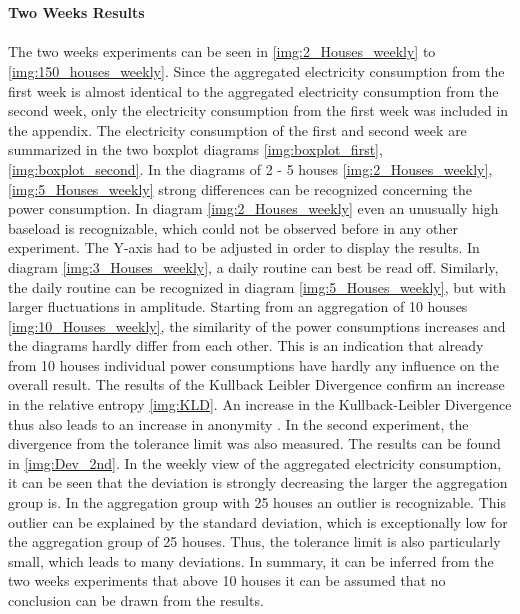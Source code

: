 \\
\\
\textbf{Two Weeks Results}
\\
\\
The two weeks experiments can be seen in \ref{img:2_Houses_weekly} to \ref{img:150_houses_weekly}. Since the aggregated electricity consumption from the first week is almost identical to the aggregated electricity consumption from the second week, only the electricity consumption from the first week was included in the appendix. The electricity consumption of the first and second week are summarized in the two boxplot diagrams \ref{img:boxplot_first}, \ref{img:boxplot_second}.
In the diagrams of 2 - 5 houses \ref{img:2_Houses_weekly}, \ref{img:5_Houses_weekly} strong differences can be recognized concerning the power consumption.
In diagram \ref{img:2_Houses_weekly} even an unusually high baseload is recognizable, which could not be observed before in any other experiment. The Y-axis had to be adjusted in order to display the results. In diagram \ref{img:3_Houses_weekly}, a daily routine can best be read off. Similarly, the daily routine can be recognized in diagram \ref{img:5_Houses_weekly}, but with larger fluctuations in amplitude. Starting from an aggregation of 10 houses \ref{img:10_Houses_weekly}, the similarity of the power consumptions increases and the diagrams hardly differ from each other. This is an indication that already from 10 houses individual power consumptions have hardly any influence on the overall result. The results of the Kullback Leibler Divergence confirm an increase in the relative entropy \ref{img:KLD}. An increase in the Kullback-Leibler Divergence thus also leads to an increase in anonymity \cite{kalogridis2010privacy}.
In the second experiment, the divergence from the tolerance limit was also measured. The results can be found in \ref{img:Dev_2nd}. In the weekly view of the aggregated electricity consumption, it can be seen that the deviation is strongly decreasing the larger the aggregation group is. In the aggregation group with 25 houses an outlier is recognizable. This outlier can be explained by the standard deviation, which is exceptionally  low for the aggregation group of 25 houses. Thus, the tolerance limit is also particularly small, which leads to many deviations. In summary, it can be inferred from the two weeks experiments that above 10 houses it can be assumed that no conclusion can be drawn from the results.


\clearpage


